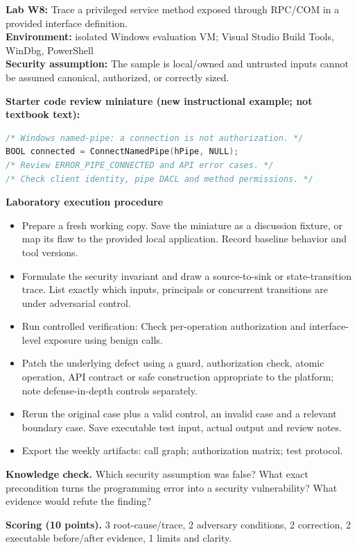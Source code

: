 \documentclass[10pt,letterpaper]{article}
\begin{document}
\begin{insight}\textbf{Lab W8:} Trace a privileged service method exposed through RPC/COM in a provided interface definition.\\\textbf{Environment:} isolated Windows evaluation VM; Visual Studio Build Tools, WinDbg, PowerShell\\\textbf{Security assumption:} The sample is local/owned and untrusted inputs cannot be assumed canonical, authorized, or correctly sized.\end{insight}
\textbf{Starter code review miniature (new instructional example; not textbook text):}
\begin{lstlisting}[language=C]
/* Windows named-pipe: a connection is not authorization. */
BOOL connected = ConnectNamedPipe(hPipe, NULL);
/* Review ERROR_PIPE_CONNECTED and API error cases. */
/* Check client identity, pipe DACL and method permissions. */
\end{lstlisting}
\textbf{Laboratory execution procedure}
\begin{itemize}[leftmargin=*,itemsep=2pt]
\item Prepare a fresh working copy. Save the miniature as a discussion fixture, or map its flaw to the provided local application. Record baseline behavior and tool versions.
\item Formulate the security invariant and draw a source-to-sink or state-transition trace. List exactly which inputs, principals or concurrent transitions are under adversarial control.
\item Run controlled verification: Check per-operation authorization and interface-level exposure using benign calls.
\item Patch the underlying defect using a guard, authorization check, atomic operation, API contract or safe construction appropriate to the platform; note defense-in-depth controls separately.
\item Rerun the original case plus a valid control, an invalid case and a relevant boundary case. Save executable test input, actual output and review notes.
\item Export the weekly artifacts: call graph; authorization matrix; test protocol.
\end{itemize}
\textbf{Knowledge check.} Which security assumption was false? What exact precondition turns the programming error into a security vulnerability? What evidence would refute the finding?

\textbf{Scoring (10 points).} 3 root-cause/trace, 2 adversary conditions, 2 correction, 2 executable before/after evidence, 1 limits and clarity.
\end{document}
